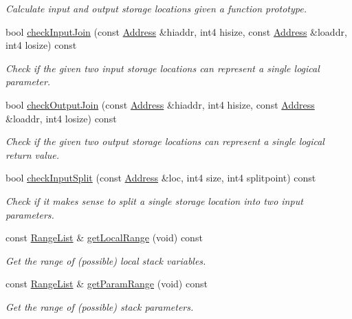 \begin{DoxyCompactItemize}
\begin{DoxyCompactList}\small\item\em Calculate input and output storage locations given a function prototype. \end{DoxyCompactList}\item 
bool \mbox{\hyperlink{class_proto_model_a06031cb84a876e36a3648362c4af8662}{check\+Input\+Join}} (const \mbox{\hyperlink{class_address}{Address}} \&hiaddr, int4 hisize, const \mbox{\hyperlink{class_address}{Address}} \&loaddr, int4 losize) const
\begin{DoxyCompactList}\small\item\em Check if the given two input storage locations can represent a single logical parameter. \end{DoxyCompactList}\item 
bool \mbox{\hyperlink{class_proto_model_a0e0ae91c9fa12f548418c469f63c9d1d}{check\+Output\+Join}} (const \mbox{\hyperlink{class_address}{Address}} \&hiaddr, int4 hisize, const \mbox{\hyperlink{class_address}{Address}} \&loaddr, int4 losize) const
\begin{DoxyCompactList}\small\item\em Check if the given two output storage locations can represent a single logical return value. \end{DoxyCompactList}\item 
bool \mbox{\hyperlink{class_proto_model_a6ddc6e7d218491b657d1f5e5bb997592}{check\+Input\+Split}} (const \mbox{\hyperlink{class_address}{Address}} \&loc, int4 size, int4 splitpoint) const
\begin{DoxyCompactList}\small\item\em Check if it makes sense to split a single storage location into two input parameters. \end{DoxyCompactList}\item 
const \mbox{\hyperlink{class_range_list}{Range\+List}} \& \mbox{\hyperlink{class_proto_model_a4736d007016235f93ae81100f8312e26}{get\+Local\+Range}} (void) const
\begin{DoxyCompactList}\small\item\em Get the range of (possible) local stack variables. \end{DoxyCompactList}\item 
const \mbox{\hyperlink{class_range_list}{Range\+List}} \& \mbox{\hyperlink{class_proto_model_a2a83c006b588fad0b0842c6f9862e66b}{get\+Param\+Range}} (void) const
\begin{DoxyCompactList}\small\item\em Get the range of (possible) stack parameters. \end{DoxyCompactList}\item 

\end{DoxyCompactItemize}
